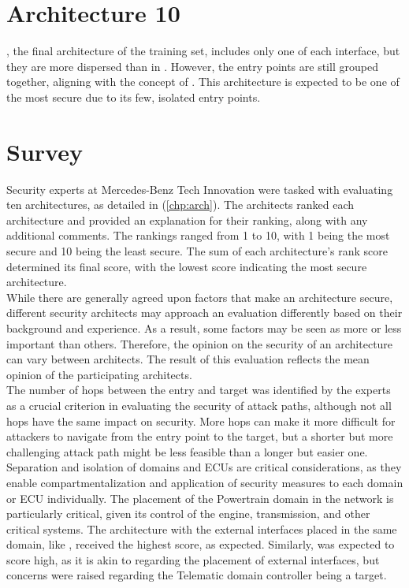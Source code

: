 \section{Architecture 10}
\label{subsec:arch10}

, the final architecture of the training set, includes only one of each interface, 
but they are more dispersed than in . 
However, the entry points are still grouped together, aligning with the concept of . 
This architecture is expected to be one of the most secure due to its few, isolated entry points.

\section{Survey}
\label{sec:survey}

Security experts at Mercedes-Benz Tech Innovation were tasked with evaluating ten architectures, 
as detailed in (\ref{chp:arch}). The architects ranked each architecture and provided an explanation 
for their ranking, along with any additional comments. 
The rankings ranged from 1 to 10, with 1 being the most secure and 10 being the least secure. 
The sum of each architecture's rank score determined its final score, 
with the lowest score indicating the most secure architecture.\\

While there are generally agreed upon factors that make an architecture secure, 
different security architects may approach an evaluation differently based on their background and experience. 
As a result, some factors may be seen as more or less important than others. 
Therefore, the opinion on the security of an architecture can vary between architects. 
The result of this evaluation reflects the mean opinion of the participating architects.\\

The number of hops between the entry and target was identified by the experts as a 
crucial criterion in evaluating the security of attack paths, although not all hops have the same impact on security. 
More hops can make it more difficult for attackers to navigate from the entry point to the target, 
but a shorter but more challenging attack path might be less feasible than a longer but easier one.\\

Separation and isolation of domains and ECUs are critical considerations, 
as they enable compartmentalization and application of security measures to each domain or ECU individually. 
The placement of the Powertrain domain in the network is particularly critical, 
given its control of the engine, transmission, and other critical systems. 
The architecture with the external interfaces placed in the same domain, like , 
received the highest score, as expected. 
Similarly,  was expected to score high, as it is akin to  
regarding the placement of external interfaces, but concerns were raised regarding the Telematic domain controller being a target.

